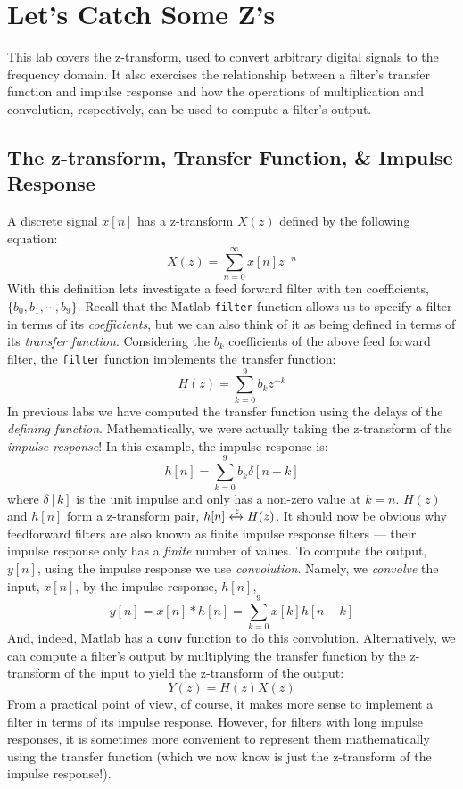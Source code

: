 
\section{Let's Catch Some Z's}

This lab covers the z-transform, used to convert arbitrary digital
signals to the frequency domain. It also exercises the relationship
between a filter's transfer function and impulse response and how the
operations of multiplication and convolution, respectively, can be
used to compute a filter's output.

\subsection{The z-transform, Transfer Function, \& Impulse Response}

A discrete signal $x[n]$ has a z-transform $X(z)$ defined by the
following equation:
\[
X(z)=\sum_{n=0}^{\infty}x[n]z^{-n}
\]
With this definition lets investigate a feed forward filter with ten
coefficients, $\{b_0, b_1,\cdots, b_9\}$.  Recall that the Matlab
\verb|filter| function allows us to specify a filter in terms of its
\emph{coefficients}, but we can also think of it as being defined in
terms of its \emph{transfer function}. Considering the $b_k$
coefficients of the above feed forward filter, the \verb|filter|
function implements the transfer function:
\begin{equation}
  H(z) = \sum_{k=0}^{9} b_k z^{-k}
\end{equation}
In previous labs we have computed the transfer function using the
delays of the \emph{defining function}.  Mathematically, we were
actually taking the z-transform of the \emph{impulse response}!  In
this example, the impulse response is:
\begin{equation}
  h[n] = \sum_{k=0}^{9} b_k \delta[n-k]
\end{equation}
where $\delta[k]$ is the unit impulse and only has a non-zero value at
$k=n$. $H(z)$ and $h[n]$ form a z-transform pair,
$h[n]\xleftrightarrow{z} H(z)$. It should now be obvious why
feedforward filters are also known as finite impulse response filters
--- their impulse response only has a \emph{finite} number of
values. To compute the output, $y[n]$, using the impulse response we
use \emph{convolution}. Namely, we \emph{convolve} the input, $x[n]$,
by the impulse response, $h[n]$,
\begin{equation}
  y[n] = x[n] \ast h[n]  = \sum_{k=0}^{9}x[k]h[n-k]
\end{equation}
And, indeed, Matlab has a \verb|conv| function to do this convolution.
Alternatively, we can compute a filter's output by multiplying the
transfer function by the z-transform of the input to yield the
z-transform of the output:
\begin{equation}
  Y(z) = H(z) X(z)
\end{equation}
From a practical point of view, of course, it makes more sense to
implement a filter in terms of its impulse response. However, for
filters with long impulse responses, it is sometimes more convenient
to represent them mathematically using the transfer function (which we
now know is just the z-transform of the impulse response!).

